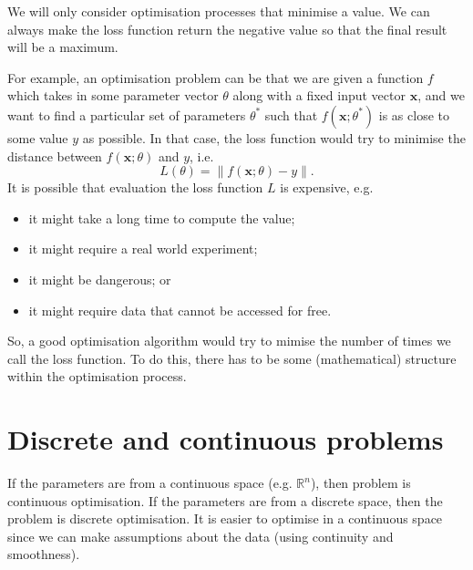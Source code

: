 \documentclass[a4paper, openany]{memoir}
\begin{document}
We will only consider optimisation processes that minimise a value. We can always make the loss function return the negative value so that the final result will be a maximum.

For example, an optimisation problem can be that we are given a function $f$ which takes in some parameter vector $\theta$ along with a fixed input vector $\mathbf{x}$, and we want to find a particular set of parameters $\theta^*$ such that $f(\mathbf{x}; \theta^*)$ is as close to some value $y$ as possible. In that case, the loss function would try to minimise the distance between $f(\mathbf{x}; \theta)$ and $y$, i.e.
\[L(\theta) = \lVert f(\mathbf{x}; \theta) - y \rVert.\]
It is possible that evaluation the loss function $L$ is expensive, e.g.
\begin{itemize}
    \item it might take a long time to compute the value;
    \item it might require a real world experiment;
    \item it might be dangerous; or
    \item it might require data that cannot be accessed for free.
\end{itemize}
So, a good optimisation algorithm would try to mimise the number of times we call the loss function. To do this, there has to be some (mathematical) structure within the optimisation process.
\newpage

\section{Discrete and continuous problems}
If the parameters are from a continuous space (e.g. $\mathbb{R}^n$), then problem is continuous optimisation. If the parameters are from a discrete space, then the problem is discrete optimisation. It is easier to optimise in a continuous space since we can make assumptions about the data (using continuity and smoothness).
\end{document}
